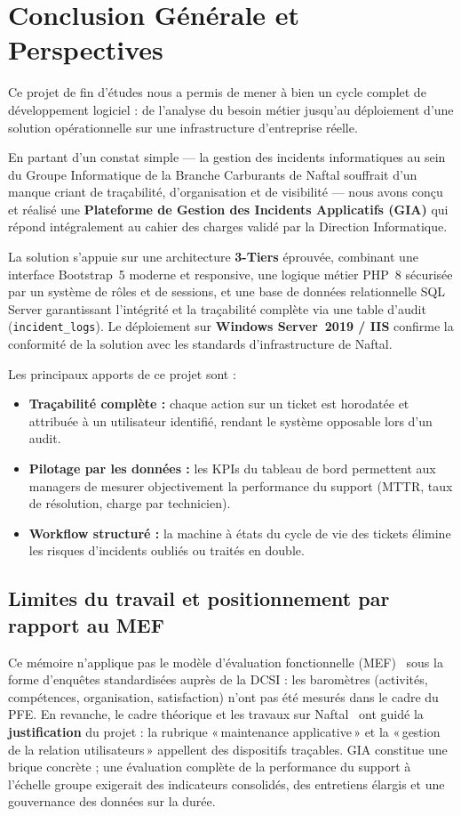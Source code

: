 \chapter*{Conclusion Générale et Perspectives}

Ce projet de fin d'études nous a permis de mener à bien un cycle complet de
développement logiciel : de l'analyse du besoin métier jusqu'au déploiement d'une
solution opérationnelle sur une infrastructure d'entreprise réelle.

En partant d'un constat simple — la gestion des incidents informatiques au sein
du Groupe Informatique de la Branche Carburants de Naftal souffrait d'un manque
criant de traçabilité, d'organisation et de visibilité — nous avons conçu et réalisé
une \textbf{Plateforme de Gestion des Incidents Applicatifs (GIA)} qui répond
intégralement au cahier des charges validé par la Direction Informatique.

La solution s'appuie sur une architecture \textbf{3-Tiers} éprouvée, combinant
une interface Bootstrap~5 moderne et responsive, une logique métier PHP~8
sécurisée par un système de rôles et de sessions, et une base de données relationnelle
SQL Server garantissant l'intégrité et la traçabilité complète via une table d'audit
(\texttt{incident\_logs}). Le déploiement sur \textbf{Windows Server~2019 / IIS}
confirme la conformité de la solution avec les standards d'infrastructure de Naftal.

Les principaux apports de ce projet sont :
\begin{itemize}
    \item \textbf{Traçabilité complète :} chaque action sur un ticket est horodatée
    et attribuée à un utilisateur identifié, rendant le système opposable lors d'un audit.
    \item \textbf{Pilotage par les données :} les KPIs du tableau de bord permettent
    aux managers de mesurer objectivement la performance du support (MTTR, taux de
    résolution, charge par technicien).
    \item \textbf{Workflow structuré :} la machine à états du cycle de vie des tickets
    élimine les risques d'incidents oubliés ou traités en double.
\end{itemize}

\section*{Limites du travail et positionnement par rapport au MEF}
Ce mémoire n'applique pas le modèle d'évaluation fonctionnelle (MEF)~\cite{autissier2008} sous
la forme d'enquêtes standardisées auprès de la DCSI : les baromètres (activités, compétences,
organisation, satisfaction) n'ont pas été mesurés dans le cadre du PFE. En revanche, le cadre
théorique et les travaux sur Naftal~\cite{meghari2014} ont guidé la \textbf{justification} du
projet : la rubrique «\,maintenance applicative\,» et la «\,gestion de la relation
utilisateurs\,» appellent des dispositifs traçables. GIA constitue une brique concrète ; une
évaluation complète de la performance du support à l'échelle groupe exigerait des indicateurs
consolidés, des entretiens élargis et une gouvernance des données sur la durée.


